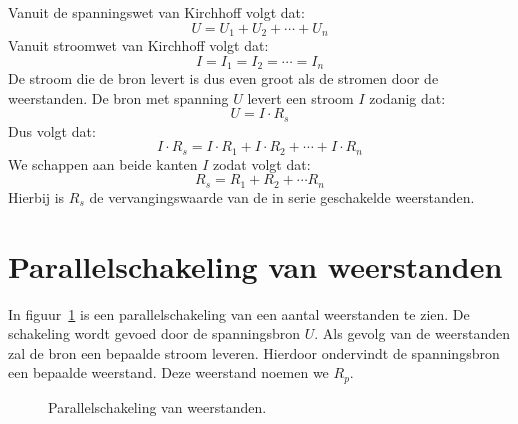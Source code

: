 Vanuit de spanningswet van Kirchhoff volgt dat:
%
\begin{equation}
U=U_1+U_2+\cdots+U_n
\end{equation}
%
Vanuit stroomwet van Kirchhoff volgt dat:
%
\begin{equation}
I = I_1 = I_2 = \cdots = I_n
\end{equation}
%
De stroom die de bron levert is dus even groot als de stromen door de weerstanden.
De bron met spanning $U$ levert een stroom $I$ zodanig dat:
%
\begin{equation}
U=I\cdot R_s
\end{equation}
%
Dus volgt dat:
%
\begin{equation}
I\cdot R_s = I\cdot R_1+I\cdot R_2+\cdots+I\cdot R_n
\end{equation}
%
We schappen aan beide kanten $I$ zodat volgt dat:
%
\begin{equation}
R_s = R_1 + R_2 + \cdots R_n
\end{equation}
%
Hierbij is $R_s$ de vervangingswaarde van de in serie geschakelde weerstanden.


\section{Parallelschakeling van weerstanden}
In figuur~\ref{fig:gelparalledschakelingweerstanden} is een parallelschakeling van een
aantal weerstanden te zien. De schakeling wordt gevoed door de spanningsbron $U$. Als
gevolg van de weerstanden zal de bron een bepaalde stroom leveren. Hierdoor ondervindt
de spanningsbron een bepaalde weerstand. Deze weerstand noemen we $R_p$.

\begin{figure}[!ht]
\centering
{}
\caption{Parallelschakeling van weerstanden.}
\label{fig:gelparalledschakelingweerstanden}
\end{figure}

